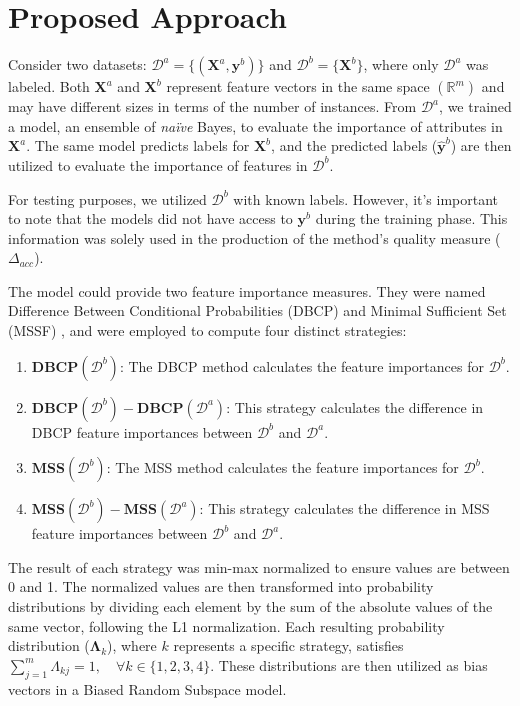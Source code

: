 \documentclass{article}
\begin{document}
\section{Proposed Approach}

Consider two datasets: $\mathcal{D}^a = \{ (\bm{X}^a, \bm{y}^b) \}$ and $\mathcal{D}^b = \{\bm{X}^b\}$, where only $\mathcal{D}^a$ was labeled. Both $\bm{X}^a$ and $\bm{X}^b$ represent feature vectors in the same space $(\mathbb{R}^m)$ and may have different sizes in terms of the number of instances. From $\mathcal{D}^a$, we trained a model, an ensemble  of \textit{na\"ive} Bayes, to evaluate the importance of attributes in $\bm{X}^a$. The same model predicts labels for $\bm{X}^b$, and the predicted labels ($\widehat{\bm{y}}^b$) are then utilized to evaluate the importance of features in $\mathcal{D}^b$.

For testing purposes, we utilized $\mathcal{D}^b$ with known labels. However, it's important to note that the models did not have access to $\bm{y}^b$ during the training phase. This information was solely used in the production of the method's quality measure ($\Delta_{acc}$).

The model could provide two feature importance measures. They were named Difference Between Conditional Probabilities (DBCP) and Minimal Sufficient Set (MSSF) \cite{maia2023}, and were employed to compute four distinct strategies:

\begin{enumerate}
	\item $\textbf{DBCP}(\mathcal{D}^b)$: The DBCP method calculates the feature importances for $\mathcal{D}^b$.
	\item $\textbf{DBCP}(\mathcal{D}^b)-\textbf{DBCP}(\mathcal{D}^a)$: This strategy calculates the difference in DBCP feature importances between $\mathcal{D}^b$ and $\mathcal{D}^a$.
	\item $\textbf{MSS}(\mathcal{D}^b)$: The MSS method calculates the feature importances for $\mathcal{D}^b$.
	\item $\textbf{MSS}(\mathcal{D}^b)-\textbf{MSS}(\mathcal{D}^a)$: This strategy calculates the difference in MSS feature importances between $\mathcal{D}^b$ and $\mathcal{D}^a$.
\end{enumerate}

The result of each strategy was min-max normalized to ensure values are between 0 and 1. The normalized values are then transformed into probability distributions by dividing each element by the sum of the absolute values of the same vector, following the L1 normalization. Each resulting probability distribution ($\bm{\Lambda}_{k}$), where $k$ represents a specific strategy, satisfies $\sum_{j =1}^{m}\Lambda_{kj}=1, \quad \forall k \in \{1,2,3,4\}$. These distributions are then utilized as bias vectors in a Biased Random Subspace model.
\end{document}
